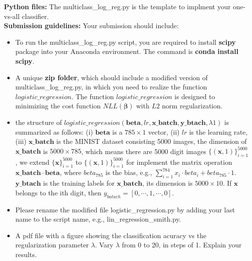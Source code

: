 \documentclass[11pt,oneside,a4paper]{article}
\begin{document}
\begin{enumerate}
\textbf{Python files:} The multiclass\_log\_reg.py is the template to implment your one-vs-all classifier. 
  \\
  \textbf{Submission guidelines:} Your submission should include:
  \begin{itemize}
  	\item To run the multiclass\_log\_reg.py script, you are required to install \textbf{scipy} package into your Anaconda environment. The command is \textbf{conda install scipy}.
  	\item A unique \textbf{zip folder}, which should include a modified version of multiclass\_log\_reg.py, in which you need to realize the function $logistic\_regression$. 
	The function $logistic\_regression$ is designed to minimizing the cost function $NLL(\pmb{\beta})$ with $L2$ norm regularization. 
	\item the structure of $logistic\_regression(\boldsymbol{beta}, lr, \boldsymbol{x\_batch}, \boldsymbol{y\_btach}, \lambda1)$ is summarized as follows: (i) $\boldsymbol{beta}$ is a $785 \times 1$ vector, (ii) $lr$ is the learning rate, (iii) $\boldsymbol{x\_batch}$ is the MINIST dataset consisting 5000 images, the dimension of $\boldsymbol{x\_batch}$ is $5000 \times 785$, which means there are 5000 digit images $\{(\boldsymbol{x}, 1)\}_{i=1}^{5000}$, we extend $\{\boldsymbol{x}\}_{i=1}^{5000}$ to $\{(\boldsymbol{x}, 1)\}_{i=1}^{5000}$ for implement the matrix operation $\boldsymbol{x\_batch} \cdot \boldsymbol{beta}$, where $beta_{785}$ is the bias, e.g., $\sum_{i=1}^{784}x_i \cdot beta_i + beta_{785} \cdot 1$. 
	$\boldsymbol{y\_btach}$ is the training labels for $\boldsymbol{x\_batch}$, its dimension is $5000 \times 10$. If $\boldsymbol{x}$ belongs to the ith digit, then $y_{batach} = [0,\cdots, 1, \cdots, 0]$.
	\item Please rename the modified file logistic\_regression.py by adding your last name to the script name, e.g., lin\_regression\_smith.py.
  	\item A pdf file with a figure showing the classification acuracy vs the regularization parameter $\lambda$. Vary $\lambda$ from 0 to 20, in steps of 1. Explain your results.
  \end{itemize}
  

\end{enumerate}
\end{document}
